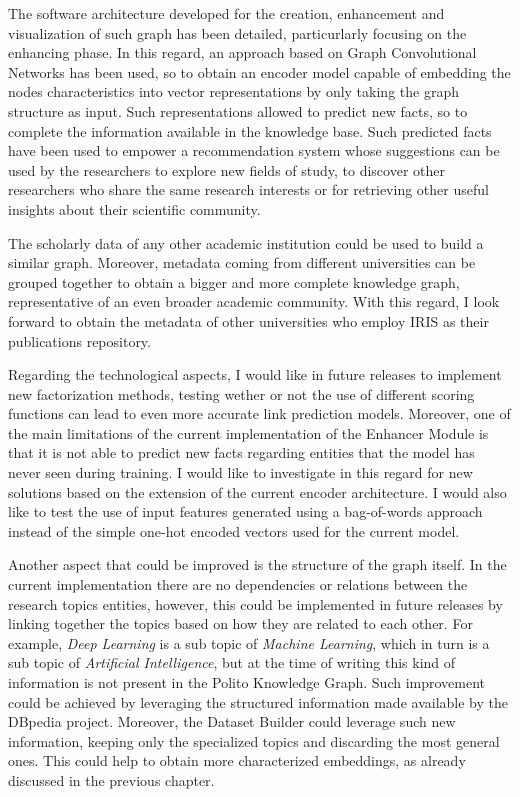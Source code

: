 \documentclass[%
    corpo=13.5pt,
    twoside,
    oldstyle,
    tipotesi=magistrale,
    greek,
    evenboxes
]{toptesi}
\begin{document}
The software architecture developed for the creation, enhancement
and visualization of such graph has been detailed, particurlarly focusing
on the enhancing phase.
In this regard, an approach based on Graph Convolutional
Networks has been used, so to obtain an encoder model capable of embedding the nodes
characteristics into vector representations by only taking the graph structure
as input.
Such representations allowed to predict new facts, so to complete the
information available in the knowledge base.
Such predicted facts have been used to empower a recommendation system whose
suggestions can be used by the researchers to explore new fields of
study, to discover other researchers who share the same research interests or
for retrieving other useful insights about their scientific community.

The scholarly data of any other academic institution could be used to
build a similar graph.
Moreover, metadata coming from different universities can be grouped
together to obtain a bigger and more complete knowledge graph,
representative of an even broader academic community.
With this regard, I look forward to obtain the metadata of other universities
who employ IRIS as their publications repository.

Regarding the technological aspects, I would like in future releases to
implement new factorization methods, testing wether or not the use of
different scoring functions can lead to even more accurate link prediction
models.
Moreover, one of the main limitations of the current implementation of the Enhancer
Module is that it is not able to predict new facts regarding entities that the
model has never seen during training. I would like to investigate in this
regard for new solutions based on the extension of the current encoder
architecture.
I would also like to test the use of input features generated using a
bag-of-words approach instead of the simple one-hot encoded vectors used for
the current model.

Another aspect that could be improved is the structure of the graph itself.
In the current implementation there are no dependencies or relations between
the research topics entities, however, this could be implemented in future
releases by linking together the topics based on how they are
related to each other.
For example, \emph{Deep Learning} is a sub topic of \emph{Machine Learning},
which in turn is a sub topic of \emph{Artificial Intelligence}, but at the time
of writing this kind of information is not present in the Polito Knowledge Graph.
Such improvement could be achieved by leveraging the structured information
made available by the DBpedia project.
Moreover, the Dataset Builder could leverage such new information, keeping only
the specialized topics and discarding the most general ones. This could help to
obtain more characterized embeddings, as already discussed in the previous
chapter.
\end{document}
